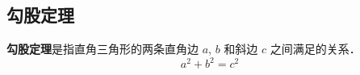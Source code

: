 
\subsection{勾股定理}
\textbf{勾股定理}是指直角三角形的两条直角边 $a$, $b$ 和斜边 $c$ 之间满足的关系．
\begin{equation}
a^2+b^2=c^2
\end{equation}